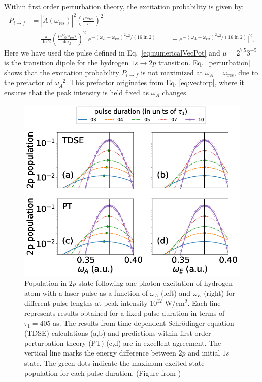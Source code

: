 Within first order perturbation theory, the excitation probability is given by:
\begin{equation}
\begin{split}
P_{i\rightarrow f}&= |\tilde{A}(\omega_\text{res})|^2\left(\frac{\mu\omega_\text{res}}{c}\right)^2 \\
&=\frac{\pi}{\ln{2}}\left(\frac{\mu E_0\omega_\text{res}\tau}{4\omega_A}\right)^2
\Big[e^{-(\omega_A-\omega_\text{res})^2\tau^2/(16\ln{2})}
\qquad -
e^{-(\omega_A+\omega_\text{res})^2\tau^2/(16\ln{2})}
\Big]^2,
\end{split}
\label{perturbation}
\end{equation}
Here we have used the pulse defined in Eq.~\ref{eq:numericalVecPot} and $\mu=2^{7.5}3^{-5}$ is the transition dipole for the hydrogen $1s\rightarrow 2p$ transition. Eq.~\ref{perturbation} shows that the excitation probability $P_{i\rightarrow f}$ is not maximized at  $\omega_A=\omega_\text{res}$, due to the prefactor of $\omega_A^{-2}$. This prefactor originates from Eq. \ref{eq:vectorp}, where it ensures that the peak intensity is held fixed as $\omega_A$ changes.

\begin{figure}[!ht]
\centering
    \includegraphics[width=0.8\linewidth]{figs/Frequency_shift/2p_population_comb.png}
\caption{
Population in $2p$ state following one-photon excitation of hydrogen atom with a laser pulse as a function of $\omega_A$ (left) and $\omega_E$ (right) for different pulse lengths at peak intensity $10^{12}$ W/cm$^2$. Each line represents results obtained for a fixed pulse duration in terms of $\tau_1=405$ as. The results from time-dependent Schr\"odinger equation (TDSE) calculations (a,b) and predictions within first-order perturbation theory (PT) (c,d) are in excellent agreement. The vertical line marks the energy difference between $2p$ and initial $1s$ state. The green dots indicate the maximum excited state population for each pulse duration. (Figure from \cite{venzke2018_Central})
}
  \label{fig:h-excited_2p}
\end{figure}


